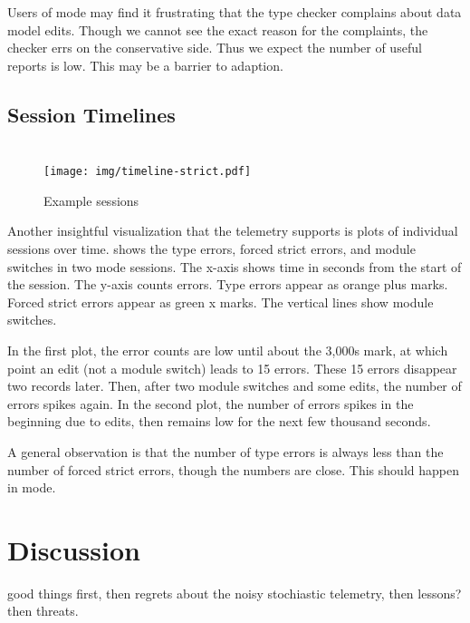 \documentclass[english,submission,cleveref]{programming}
\begin{document}
Users of \mstrict{} mode may find it frustrating that the type checker complains
about data model edits.
Though we cannot see the exact reason for the complaints, the checker errs on
the conservative side.
Thus we expect the number of useful reports is low.
This may be a barrier to adaption.


\subsection{Session Timelines}

\begin{figure}[t]\centering

  \medskip{}
  \mstrict{}\\
  \texttt{[image: img/timeline-strict.pdf]}

  \caption{Example sessions}
  \label{f:indy-session}
\end{figure}

Another insightful visualization that the telemetry supports is plots of individual sessions
over time.
 shows the type errors, forced strict errors, and module switches
in two \mstrict{} mode sessions.
The x-axis shows time in seconds from the start of the session.
The y-axis counts errors.
Type errors appear as orange plus marks.
Forced strict errors appear as green x marks.
The vertical lines show module switches.

In the first plot, the error counts are low until about the 3,000s mark,
at which point an edit (not a module switch) leads to 15 errors.
These 15 errors disappear two records later.
Then, after two module switches and some edits, the number of errors spikes again.
In the second plot, the number of errors spikes in the beginning due to edits,
then remains low for the next few thousand seconds.

A general observation is that the number of type errors is always less than the number of forced strict
errors, though the numbers are close.
This should happen in \mstrict{} mode.


\section{Discussion}
\label{s:discussion}

\FILL{} good things first,
then regrets about the noisy stochiastic telemetry,
then lessons?
then threats.
\end{document}
